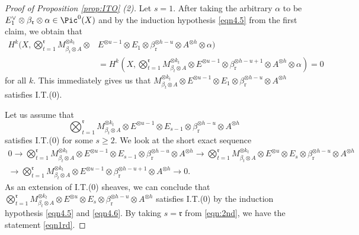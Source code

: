 \documentclass[11pt,letter]{amsart}
\numberwithin{equation}{section}
\begin{document}
\begin{proof}[Proof of Proposition \ref{prop:ITO} (2)]
 Let $s=1$. After taking the arbitrary $\alpha$ to be $E_1^\vee\otimes \beta_{\mathfrak{r}}\otimes \alpha\in\Pic^0(X)$ and by the induction hypothesis \eqref{eqn4.5} from the first claim, we obtain that 
 \begin{align*}
 H^k\Bigg(X,\bigotimes_{t=1}^\mathfrak{r} M_{\beta_t\otimes A}^{\otimes k_t}\otimes & E^{\otimes u-1}\otimes E_{1}\otimes \beta_{\mathrm{r}}^{\otimes h-u}\otimes A^{\otimes h}
\otimes\alpha\Bigg)\\
&=H^k\left(X,\bigotimes_{t=1}^\mathfrak{r} M_{\beta_t\otimes A}^{\otimes k_t}\otimes E^{\otimes u-1}\otimes \beta_{\mathrm{r}}^{\otimes h-u+1}\otimes A^{\otimes h}
\otimes\alpha\right)=0\end{align*}
for all $k$. This immediately gives us that $M_{\beta_t\otimes A}^{\otimes k_t}\otimes  E^{\otimes u-1}\otimes E_{1}\otimes \beta_{\mathrm{r}}^{\otimes h-u}\otimes A^{\otimes h}$ satisfies I.T.(0).


Let us assume that 
\begin{equation}\label{eqn4.6}
\bigotimes_{t=1}^{\mathfrak{r}}M_{\beta_t\otimes A}^{\otimes k_t}\otimes E^{\otimes u-1}\otimes E_{s-1}\otimes \beta_{\mathrm{r}}^{\otimes h-u}\otimes A^{\otimes h}
\end{equation}
satisfies I.T.(0) for some $s\geq 2$. We look at the short exact sequence
\begin{align*}
0\rightarrow \bigotimes_{t=1}^{\mathfrak{r}}M_{\beta_t\otimes A}^{\otimes k_t}\otimes E^{\otimes u-1}\otimes E_{s-1}\otimes \beta_{\mathrm{r}}^{\otimes h-u}\otimes A^{\otimes h}\longrightarrow \bigotimes_{t=1}^{\mathfrak{r}}M_{\beta_t\otimes A}^{\otimes k_t}\otimes E^{\otimes u}\otimes E_s\otimes\beta_{\mathrm{r}}^{\otimes h-u}\otimes A^{\otimes h}\\
\longrightarrow \bigotimes_{t=1}^{\mathfrak{r}}M_{\beta_t\otimes A}^{\otimes k_t}\otimes E^{\otimes u-1}\otimes \beta_{\mathrm{r}}^{\otimes h-u+1}\otimes A^{\otimes h}\rightarrow 0.
\end{align*}
As an extension of I.T.(0) sheaves, we can conclude that $\bigotimes_{t=1}^{\mathfrak{r}}M_{\beta_t\otimes A}^{\otimes k_t}\otimes E^{\otimes u}\otimes E_s\otimes\beta_{\mathrm{r}}^{\otimes h-u}\otimes A^{\otimes h}$ satisfies I.T.(0) by the induction hypothesis \eqref{eqn4.5} and \eqref{eqn4.6}. By taking $s=\mathfrak{r}$ from \eqref{eqn:2nd}, we have the statement \eqref{eqn1rd}.
  \end{proof}

%
\end{document}
